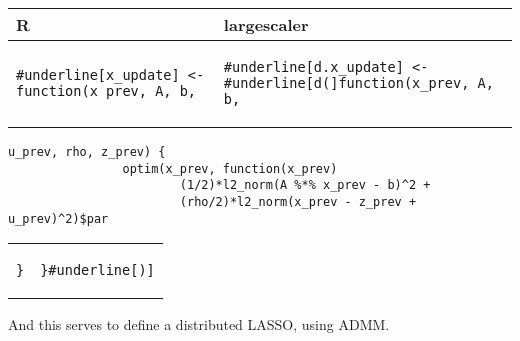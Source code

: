 \begin{table}[H]
\centering
\begin{tabular}{p{} | p{}}
R & largescaler \\ \midrule
\begin{Verbatim}[commandchars=\#\[\]]
#underline[x_update] <- function(x_prev, A, b,
\end{Verbatim}
& 
\begin{Verbatim}[commandchars=\#\[\]]
#underline[d.x_update] <- #underline[d(]function(x_prev, A, b,
\end{Verbatim}
\end{tabular}
\begin{Verbatim}[commandchars=\#\[\]]
                     u_prev, rho, z_prev) {
                optim(x_prev, function(x_prev)
                        (1/2)*l2_norm(A %*% x_prev - b)^2 +
                        (rho/2)*l2_norm(x_prev - z_prev + u_prev)^2)$par
\end{Verbatim}
\begin{tabular}{p{} | p{}}
\begin{Verbatim}[commandchars=\#\[\]]
                 }
\end{Verbatim}
&
\begin{Verbatim}[commandchars=\#\[\]]
                 }#underline[)]
\end{Verbatim}
\\
\end{tabular}
\end{table}

And this serves to define a distributed LASSO, using ADMM.

